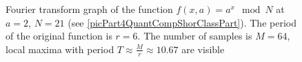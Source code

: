 \begin{figure}
\centering



\caption{Fourier transform graph of the function 
  $f\left(x, a\right) = a^x \mod{N}$ at $a=2$, $N = 21$
  (see \autoref{picPart4QuantCompShorClassPart}). The period of the original
  function is $r = 6$. The number of samples is $M = 64$, local maxima 
  with period $T \approx \frac{M}{r} \approx 10.67$ are visible}
\label{picPart4QuantCompShorClassPartFourier}
\end{figure}